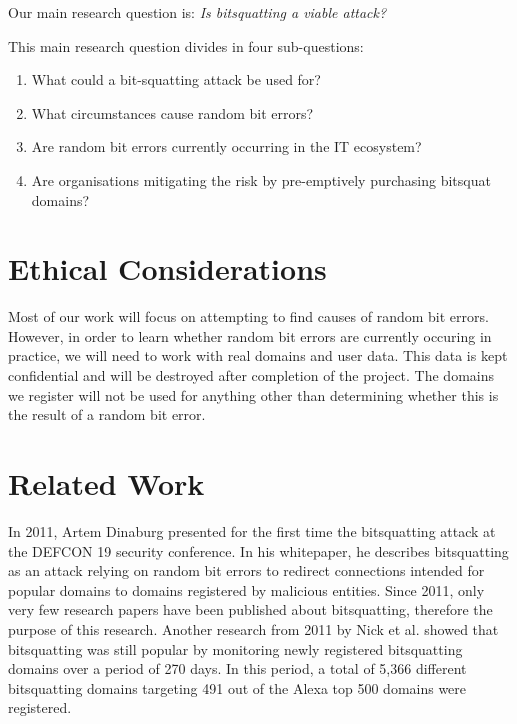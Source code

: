\documentclass[conference]{IEEEtran}
\begin{document}
Our main research question is:
{\it Is bitsquatting a viable attack?}

\vspace{0.1cm}

\noindent{} This main research question divides in four sub-questions:

\begin{enumerate}
    \item What could a bit-squatting attack be used for?
	\item What circumstances cause random bit errors?
	\item Are random bit errors currently occurring in the IT ecosystem? %
	\item Are organisations mitigating the risk by pre-emptively purchasing
	      bitsquat domains?
\end{enumerate}


\section{Ethical Considerations}\label{sec:ethics}

Most of our work will focus on attempting to find causes of random bit errors.
However, in order to learn whether random bit errors are currently occuring in
practice, we will need to work with real domains and user data. This data is
kept confidential and will be destroyed after completion of the project. The
domains we register will not be used for anything other than determining
whether this is the result of a random bit error.


\section{Related Work}\label{sec:relwork}

In 2011, Artem Dinaburg presented for the first time the bitsquatting attack at
the DEFCON 19 security conference. In his
whitepaper\cite{dinaburg2011bitsquatting}, he describes bitsquatting as an
attack relying on random bit errors to redirect connections intended for
popular domains to domains registered by malicious entities. Since 2011, only
very few research papers have been published about bitsquatting, therefore the
purpose of this research. Another research from 2011 by Nick et
al.\cite{nikiforakis2013bitsquatting} showed that bitsquatting was still
popular by monitoring newly registered bitsquatting domains over a period of
270 days. In this period, a total of 5,366 different bitsquatting domains
targeting 491 out of the Alexa top 500 domains were registered.
\end{document}
